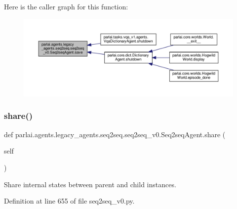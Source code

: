 Here is the caller graph for this function\+:
\nopagebreak
\begin{figure}[H]
\begin{center}
\leavevmode
\includegraphics[width=350pt]{classparlai_1_1agents_1_1legacy__agents_1_1seq2seq_1_1seq2seq__v0_1_1Seq2seqAgent_a31c017cd07b01834a5d467fadfddd7cd_icgraph}
\end{center}
\end{figure}
\mbox{\label{classparlai_1_1agents_1_1legacy__agents_1_1seq2seq_1_1seq2seq__v0_1_1Seq2seqAgent_ac050147b69c47182730e92866f64156a}} 
\subsubsection{\texorpdfstring{share()}{share()}}
{\footnotesize\ttfamily def parlai.\+agents.\+legacy\+\_\+agents.\+seq2seq.\+seq2seq\+\_\+v0.\+Seq2seq\+Agent.\+share (\begin{DoxyParamCaption}\item[{}]{self }\end{DoxyParamCaption})}

\begin{DoxyVerb}Share internal states between parent and child instances.\end{DoxyVerb}
 

Definition at line 655 of file seq2seq\+\_\+v0.\+py.




